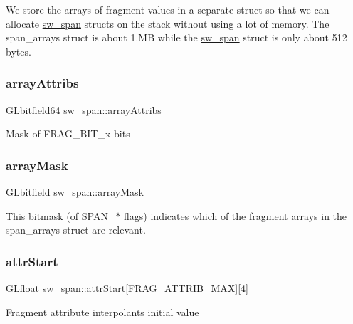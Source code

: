 We store the arrays of fragment values in a separate struct so that we can allocate \hyperlink{structsw__span}{sw\+\_\+span} structs on the stack without using a lot of memory. The span\+\_\+arrays struct is about 1.\+MB while the \hyperlink{structsw__span}{sw\+\_\+span} struct is only about 512 bytes. \mbox{\label{structsw__span_aed81efc036de89ec02981e9b51efd80b}} 
\subsubsection{\texorpdfstring{array\+Attribs}{arrayAttribs}}
{\footnotesize\ttfamily G\+Lbitfield64 sw\+\_\+span\+::array\+Attribs}

Mask of F\+R\+A\+G\+\_\+\+B\+I\+T\+\_\+x bits \mbox{\label{structsw__span_a61e6df73a3fef2eb4966716862a625cd}} 
\subsubsection{\texorpdfstring{array\+Mask}{arrayMask}}
{\footnotesize\ttfamily G\+Lbitfield sw\+\_\+span\+::array\+Mask}

\hyperlink{namespace_this}{This} bitmask (of \hyperlink{group___span_flags}{S\+P\+A\+N\+\_\+$\ast$ flags}) indicates which of the fragment arrays in the span\+\_\+arrays struct are relevant. \mbox{\label{structsw__span_ad5f24a447e02e859c3bb74aad5fa2cc1}} 
\subsubsection{\texorpdfstring{attr\+Start}{attrStart}}
{\footnotesize\ttfamily G\+Lfloat sw\+\_\+span\+::attr\+Start\mbox{[}F\+R\+A\+G\+\_\+\+A\+T\+T\+R\+I\+B\+\_\+\+M\+AX\mbox{]}\mbox{[}4\mbox{]}}

Fragment attribute interpolants initial value \mbox{\label{structsw__span_a57d4694fd1017135a5b96b3a91dfb8b9}} 
